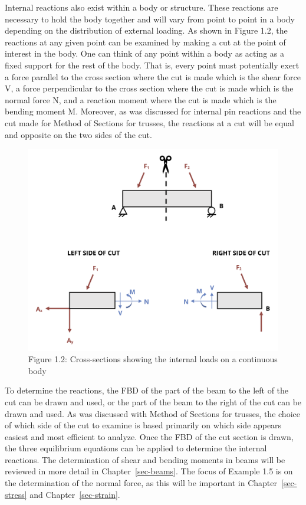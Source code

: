 \documentclass[
  letterpaper,
  DIV=11,
  numbers=noendperiod]{scrreprt}
\theoremstyle{definition}
\theoremstyle{remark}
\begin{document}
Internal reactions also exist within a body or structure. These
reactions are necessary to hold the body together and will vary from
point to point in a body depending on the distribution of external
loading. As shown in Figure 1.2, the reactions at any given point can be
examined by making a cut at the point of interest in the body. One can
think of any point within a body as acting as a fixed support for the
rest of the body. That is, every point must potentially exert a force
parallel to the cross section where the cut is made which is the shear
force V, a force perpendicular to the cross section where the cut is
made which is the normal force N, and a reaction moment where the cut is
made which is the bending moment M. Moreover, as was discussed for
internal pin reactions and the cut made for Method of Sections for
trusses, the reactions at a cut will be equal and opposite on the two
sides of the cut.

\begin{figure}[H]

{\centering \includegraphics[width=5.03125in,height=\textheight]{images/CH1 PNGs/figure 1.2.png}

}

\caption{Figure 1.2: Cross-sections showing the internal loads on a
continuous body}

\end{figure}%

To determine the reactions, the FBD of the part of the beam to the left
of the cut can be drawn and used, or the part of the beam to the right
of the cut can be drawn and used. As was discussed with Method of
Sections for trusses, the choice of which side of the cut to examine is
based primarily on which side appears easiest and most efficient to
analyze. Once the FBD of the cut section is drawn, the three equilibrium
equations can be applied to determine the internal reactions. The
determination of shear and bending moments in beams will be reviewed in
more detail in Chapter~\ref{sec-beams}. The focus of Example 1.5 is on
the determination of the normal force, as this will be important in
Chapter~\ref{sec-stress} and Chapter~\ref{sec-strain}.
\end{document}
